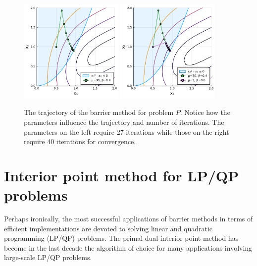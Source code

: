 \begin{figure}[h]
	\center
	\includegraphics[width = 0.45\textwidth]{part_2/chapter_10/figures/ex3-barrier-1.pdf}
	\includegraphics[width = 0.45\textwidth]{part_2/chapter_10/figures/ex3-barrier-2.pdf}
	\caption{The trajectory of the barrier method for problem $P$. Notice how the parameters influence the trajectory and number of iterations. The parameters on the left require 27 iterations while those on the right require 40 iterations for convergence.} \label{fig:barrier_2}
\end{figure}



\section{Interior point method for LP/QP problems}


Perhaps ironically, the most successful applications of barrier methods in terms of efficient implementations are devoted to solving linear and quadratic programming (LP/QP) problems. The primal-dual interior point method has become in the last decade the algorithm of choice for many applications involving large-scale LP/QP problems. 

